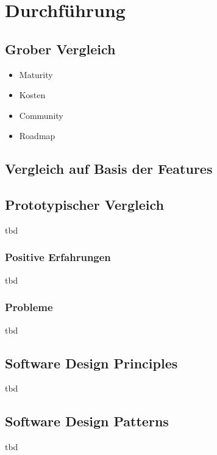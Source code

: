 \section{Durchführung}

\subsection{Grober Vergleich}
\begin{itemize}
    \item Maturity
    \item Kosten
    \item Community
    \item Roadmap
\end{itemize}

\subsection{Vergleich auf Basis der Features}


\subsection{Prototypischer Vergleich}
tbd

\subsubsection{Positive Erfahrungen}
tbd

\subsubsection{Probleme}
tbd

\subsection{Software Design Principles}
tbd

\subsection{Software Design Patterns}
tbd
